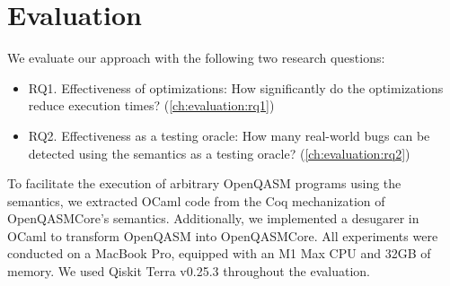 \chapter{Evaluation} \label{ch:evaluation}

\noindent
We evaluate our approach with the following two research questions:
%
\begin{itemize}
	\item RQ1. Effectiveness of optimizations: How significantly do the optimizations
	      reduce execution times? (\cref{ch:evaluation:rq1})
	\item RQ2. Effectiveness as a testing oracle: How many real-world bugs can be
	      detected using the semantics as a testing oracle? (\cref{ch:evaluation:rq2})
\end{itemize}
%
To facilitate the execution of arbitrary OpenQASM programs using the semantics,
we extracted OCaml code from the Coq mechanization of OpenQASMCore's semantics.
Additionally, we implemented a desugarer in OCaml to transform OpenQASM into
OpenQASMCore.
%
All experiments were conducted on a MacBook Pro, equipped with an M1 Max CPU
and 32GB of memory.
%
We used Qiskit Terra v0.25.3 throughout the evaluation.

